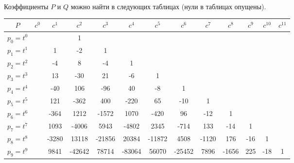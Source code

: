 \documentclass[12pt,a4paper]{article}
\begin{document}
    \begin{example}
        Коэффициенты $P$ и $Q$ можно найти в следующих таблицах (нули в таблицах опущены).
        \begin{table}[H]
            \centering
            \begin{tabular}{c||c|c|c|c|c|c|c|c|c|c|c|c}
                $P$& $c^0$& $c^1$& $c^2$& $c^3$& $c^4$& $c^5$& $c^6$& $c^7$& $c^8$& $c^9$& $c^{10}$& $c^{11}$\\
                \hline
                \hline
                $p_0 = t^0$&&&1&&&&&&&&&\\
                \hline
                $p_1 = t^1$&& 1& -2& 1&&&&&&&&\\
                \hline
                $p_2 = t^2$&& -4& 8& -4& 1&&&&&&&\\
                \hline
                $p_3 = t^3$&& 13& -30& 21& -6& 1&&&&&&\\
                \hline
                $p_4 = t^4$&& -40& 106& -96& 40& -8& 1&&&&&\\
                \hline
                $p_5 = t^5$&& 121& -362& 400& -220& 65& -10& 1&&&&\\
                \hline
                $p_6 = t^6$&& -364& 1212& -1572& 1070& -420& 96& -12& 1&&&\\
                \hline
                $p_7 = t^7$&& 1093& -4006& 5943& -4802& 2345& -714& 133& -14& 1&&\\
                \hline
                $p_8 = t^8$&& -3280& 13118& -21856& 20384& -11872& 4508& -1120& 176& -16& 1&\\
                \hline
                $p_9 = t^9$&& 9841& -42642& 78714& -83064& 56070& -25452& 7896& -1656& 225& -18& 1\\
            \end{tabular}


\end{table}
\end{example}
\end{document}
